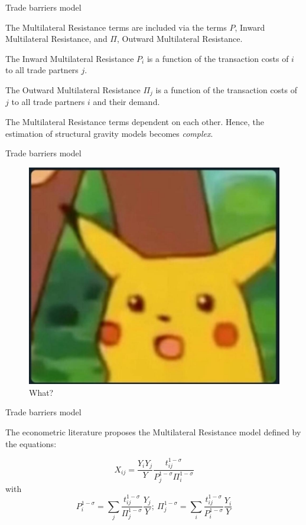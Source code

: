\documentclass[ignorenonframetext,compress,aspectratio=169]{beamer}
\begin{document}
\begin{frame}{Trade barriers model}

The Multilateral Resistance terms are included via the terms \(P\),
Inward Multilateral Resistance, and \(\Pi\), Outward Multilateral
Resistance.

The Inward Multilateral Resistance \(P_i\) is a function of the
transaction costs of \(i\) to all trade partners \(j\).

The Outward Multilateral Resistance \(\Pi_{j}\) is a function of the
transaction costs of \(j\) to all trade partners \(i\) and their demand.

The Multilateral Resistance terms dependent on each other. Hence, the
estimation of structural gravity models becomes \emph{complex}.

\end{frame}

\begin{frame}{Trade barriers model}

\begin{figure}
\centering
\includegraphics{pikachu.jpg}
\caption{What?}
\end{figure}

\end{frame}

\begin{frame}{Trade barriers model}

The econometric literature proposes the Multilateral Resistance model
defined by the equations:

\[
X_{ij}=\frac{Y_{i}Y_{j}}{Y}\frac{t_{ij}^{1-\sigma}}{P_{j}^{1-\sigma}\Pi_{i}^{1-\sigma}}
\] with \[
P_{i}^{1-\sigma}=\sum_{j}\frac{t_{ij}^{1-\sigma}}{\Pi_{j}^{1-\sigma}}\frac{Y_{j}}{Y};\:\Pi_{j}^{1-\sigma}=\sum_{i}\frac{t_{ij}^{1-\sigma}}{P_{i}^{1-\sigma}}\frac{Y_{i}}{Y}
\]

\end{frame}
\end{document}
